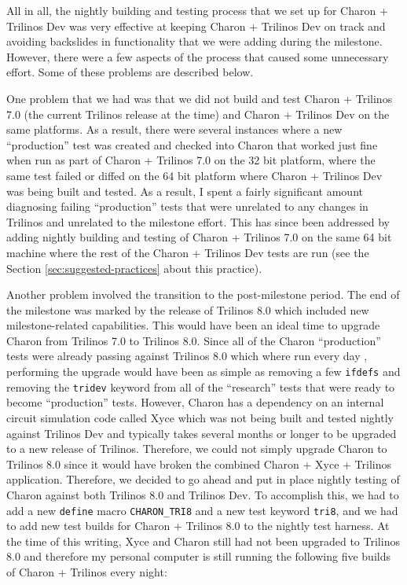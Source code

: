 \documentclass[pdf,ps2pdf,11pt]{SANDreport}
\begin{document}
All in all, the nightly building and testing process that we set up for Charon
+ Trilinos Dev was very effective at keeping Charon + Trilinos Dev on track
and avoiding backslides in functionality that we were adding during the
milestone.  However, there were a few aspects of the process that caused some
unnecessary effort.  Some of these problems are described below.

One problem that we had was that we did not build and test Charon + Trilinos
7.0 (the current Trilinos release at the time) and Charon + Trilinos Dev on
the same platforms.  As a result, there were several instances where a new
``production'' test was created and checked into Charon that worked just fine
when run as part of Charon + Trilinos 7.0 on the 32 bit platform, where the
same test failed or diffed on the 64 bit platform where Charon + Trilinos Dev
was being built and tested.  As a result, I spent a fairly significant amount
diagnosing failing ``production'' tests that were unrelated to any changes in
Trilinos and unrelated to the milestone effort.  This has since been addressed
by adding nightly building and testing of Charon + Trilinos 7.0 on the same 64
bit machine where the rest of the Charon + Trilinos Dev tests are run (see the
Section {}\ref{sec:suggested-practices} about this practice).

Another problem involved the transition to the post-milestone period.  The end
of the milestone was marked by the release of Trilinos 8.0 which included new
milestone-related capabilities.  This would have been an ideal time to upgrade
Charon from Trilinos 7.0 to Trilinos 8.0.  Since all of the Charon
``production'' tests were already passing against Trilinos 8.0 which where run
every day , performing the upgrade would have been as simple as removing a few
{}\texttt{ifdefs} and removing the {}\texttt{tridev} keyword from all of the
``research'' tests that were ready to become ``production'' tests.  However,
Charon has a dependency on an internal circuit simulation code called Xyce
which was not being built and tested nightly against Trilinos Dev and
typically takes several months or longer to be upgraded to a new release of
Trilinos.  Therefore, we could not simply upgrade Charon to Trilinos 8.0 since
it would have broken the combined Charon + Xyce + Trilinos application.
Therefore, we decided to go ahead and put in place nightly testing of Charon
against both Trilinos 8.0 and Trilinos Dev.  To accomplish this, we had to add
a new {}\texttt{define} macro {}\texttt{CHARON\_TRI8} and a new test keyword
{}\texttt{tri8}, and we had to add new test builds for Charon + Trilinos 8.0
to the nightly test harness.  At the time of this writing, Xyce and Charon
still had not been upgraded to Trilinos 8.0 and therefore my personal computer
is still running the following five builds of Charon + Trilinos every night:
\end{document}

